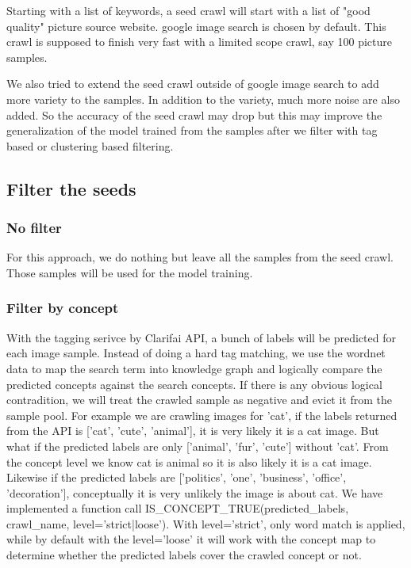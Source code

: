 \documentclass[paper=a4, fontsize=11pt]{scrartcl}
\numberwithin{equation}{section}		%
\numberwithin{figure}{section}			%
\numberwithin{table}{section}				%
\begin{document}
\begin{multicols}{2}
Starting with a list of keywords, a seed crawl will start with a list of "good quality" picture source website.
google image search is chosen by default.
This crawl is supposed to finish very fast with a limited scope crawl, say 100 picture samples.

We also tried to extend the seed crawl outside of google image search to add more variety to the samples. In addition to the variety, much more noise are also added. So the accuracy of the seed crawl may drop but this may improve the generalization of the model trained from the samples after we filter with tag based or clustering based filtering.

\subsection{Filter the seeds}

\subsubsection{No filter}

For this approach, we do nothing but leave all the samples from the seed crawl. Those samples will be used for the model training.

\subsubsection{Filter by concept}
With the tagging serivce by Clarifai API, a bunch of labels will be predicted for each image sample. Instead of doing a hard tag matching, we use the wordnet data to map the search term into knowledge graph and logically compare the predicted concepts against the search concepts. If there is any obvious logical contradition, we will treat the crawled sample as negative and evict it from the sample pool. For example we are crawling images for 'cat', if the labels returned from the API is ['cat', 'cute', 'animal'], it is very likely it is a cat image. But what if the predicted labels are only ['animal', 'fur', 'cute'] without 'cat'. From the concept level we know cat is animal so it is also likely it is a cat image. Likewise if the predicted labels are ['politics', 'one', 'business', 'office', 'decoration'], conceptually it is very unlikely the image is about cat. We have implemented a function call IS\_CONCEPT\_TRUE(predicted\_labels, crawl\_name, level='strict|loose'). With level='strict', only word match is applied, while by default with the level='loose' it will work with the concept map to determine whether the predicted labels cover the crawled concept or not. 


\end{multicols}
\end{document}
